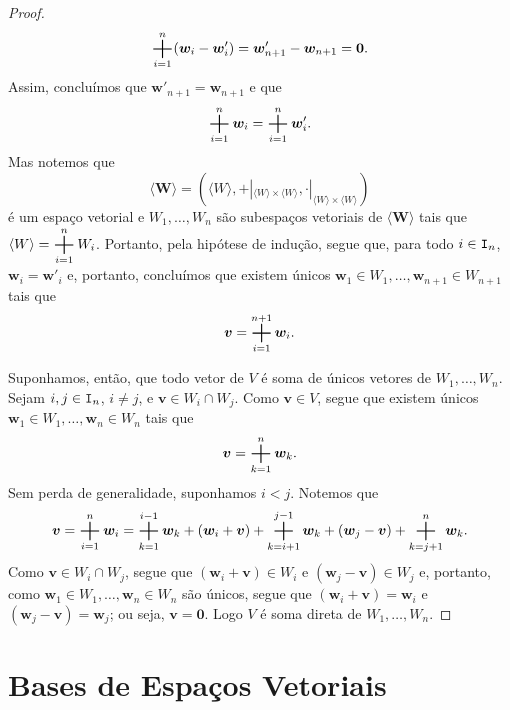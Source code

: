 \begin{proof}
	\begin{equation*}
	\bigsum_{i=1}^n (\bm w_i - \bm w'_i) = \bm w'_{n+1} - \bm w_{n+1} = \bm 0.
	\end{equation*}
Assim, concluímos que $\bm w'_{n+1}=\bm w_{n+1}$ e que
	\begin{equation*}
	\bigsum_{i=1}^n \bm w_i = \bigsum_{i=1}^n \bm w'_i.
	\end{equation*}
Mas notemos que
	\begin{equation*}
	\bm{\langle W \rangle}=(\langle W \rangle,+|_{\langle W \rangle \times \langle W \rangle},\cdot|_{\langle W \rangle \times \langle W \rangle})
	\end{equation*}
é um espaço vetorial e $W_1,\ldots,W_n$ são subespaços vetoriais de $\bm{\langle W \rangle}$ tais que $\langle W \rangle=\displaystyle\bigsum_{i=1}^n W_i$. Portanto, pela hipótese de indução, segue que, para todo $i \in \mathtt I_n$, $\bm w_i = \bm w'_i$ e, portanto, concluímos que existem únicos $\bm w_1 \in W_1,\ldots,\bm w_{n+1} \in W_{n+1}$ tais que
	\begin{equation*}
	\bm v = \bigsum_{i=1}^{n+1} \bm w_i.
	\end{equation*}

	Suponhamos, então, que todo vetor de $V$ é soma de únicos vetores de $W_1,\ldots,W_n$. Sejam $i,j \in \mathtt I_n$, $i \neq j$, e $\bm v \in W_i \cap W_j$. Como $\bm v \in V$, segue que existem únicos $\bm w_1 \in W_1, \ldots, \bm w_n \in W_n$ tais que
	\begin{equation*}
	\bm v = \bigsum_{k=1}^n \bm w_k.
	\end{equation*}
Sem perda de generalidade, suponhamos $i<j$. Notemos que
	\begin{equation*}
	\bm v = \bigsum_{i=1}^n \bm w_i = \bigsum_{k=1}^{i-1} \bm w_k + (\bm w_i+\bm v) +  \bigsum_{k=i+1}^{j-1} \bm w_k + (\bm w_j - \bm v) + \bigsum_{k=j+1}^n \bm w_k.
	\end{equation*}
Como $\bm v \in W_i \cap W_j$, segue que $(\bm w_i+\bm v) \in W_i$ e $(\bm w_j - \bm v) \in W_j$ e, portanto, como $\bm w_1 \in W_1, \ldots, \bm w_n \in W_n$ são únicos, segue que $(\bm w_i+\bm v) = \bm w_i$ e $(\bm w_j - \bm v) = \bm w_j$; ou seja, $\bm v = \bm 0$. Logo $V$ é soma direta de $W_1,\ldots,W_n$.
\end{proof}


\section{Bases de Espaços Vetoriais}

